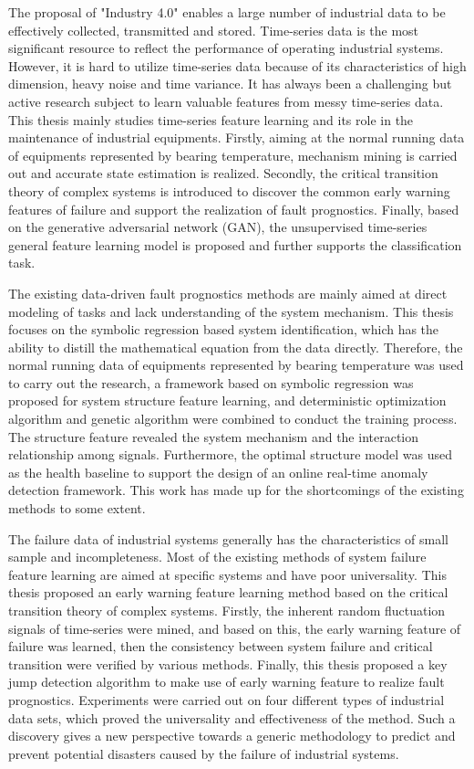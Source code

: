 \begin{eabstract}

The proposal of "Industry 4.0" enables a large number of industrial data to be effectively collected, transmitted and stored. Time-series data is the most significant resource to reflect the performance of operating industrial systems. However, it is hard to utilize time-series data because of its characteristics of high dimension, heavy noise and time variance. It has always been a challenging but active research subject to learn valuable features from messy time-series data. This thesis mainly studies time-series feature learning and its role in the maintenance of industrial equipments. Firstly, aiming at the normal running data of equipments represented by bearing temperature, mechanism mining is carried out and accurate state estimation is realized. Secondly, the critical transition theory of complex systems is introduced to discover the common early warning features of failure and support the realization of fault prognostics. Finally, based on the generative adversarial network (GAN), the unsupervised time-series general feature learning model is proposed and further supports the classification task. 

The existing data-driven fault prognostics methods are mainly aimed at direct modeling of tasks and lack understanding of the system mechanism. This thesis focuses on the symbolic regression based system identification, which has the ability to distill the mathematical equation from the data directly. Therefore, the normal running data of equipments represented by bearing temperature was used to carry out the research, a framework based on symbolic regression was proposed for system structure feature learning, and deterministic optimization algorithm and genetic algorithm were combined to conduct the training process. The structure feature revealed the system mechanism and the interaction relationship among signals. Furthermore, the optimal structure model was used as the health baseline to support the design of an online real-time anomaly detection framework. This work has made up for the shortcomings of the existing methods to some extent.

The failure data of industrial systems generally has the characteristics of small sample and incompleteness. Most of the existing methods of system failure feature learning are aimed at specific systems and have poor universality. This thesis proposed an early warning feature learning method based on the critical transition theory of complex systems. Firstly, the inherent random fluctuation signals of time-series were mined, and based on this, the early warning feature of failure was learned, then the consistency between system failure and critical transition were verified by various methods. Finally, this thesis proposed a key jump detection algorithm to make use of early warning feature to realize fault prognostics. Experiments were carried out on four different types of industrial data sets, which proved the universality and effectiveness of the method. Such a discovery gives a new perspective towards a generic methodology to predict and prevent potential disasters caused by the failure of industrial systems. 


\end{eabstract}
